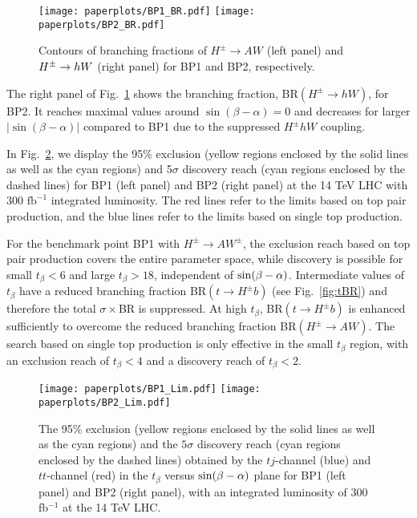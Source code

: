  \begin{figure}[h!]
 \centering
 	\texttt{[image: paperplots/BP1\_BR.pdf]}
	\texttt{[image: paperplots/BP2\_BR.pdf]}
\caption{Contours of branching fractions of $H^{\pm} \rightarrow AW$ (left panel) and $ H^{\pm} \rightarrow h W$ (right panel) for BP1 and BP2, respectively. }
\label{fig:imp_BP_BR}
\end{figure}

The right panel of Fig.~\ref{fig:imp_BP_BR} shows the branching fraction, BR$(H^{\pm} \rightarrow hW)$, for BP2. It reaches maximal values around $\sin(\beta-\alpha)=0$ and decreases for larger $|\sin(\beta-\alpha)|$ compared to BP1 due to the suppressed $H^{\pm} h W$ coupling. 

In Fig.~\ref{fig:imp_BP_Lim}, we display the 95\% exclusion (yellow regions enclosed by the solid lines as well as the cyan regions) and 5$\sigma$ discovery reach (cyan regions enclosed by the dashed lines) for BP1 (left panel) and BP2 (right panel) at the 14 TeV LHC with 300 $\text{fb}^{-1}$ integrated luminosity. The red lines refer to the limits based on top pair production, and the blue lines refer to the limits based on single top production.  

 For the benchmark point BP1 with $H^{\pm} \rightarrow AW^{\pm}$, the exclusion reach based on top pair production covers the entire parameter space, while discovery is possible for small $t_{\beta}<6$ and large $t_{\beta}>18$, independent of $\sin(\beta-\alpha)$. Intermediate values of $t_{\beta}$ have a reduced branching fraction BR$(t \rightarrow H^{\pm} b)$ (see Fig.~\ref{fig:tBR}) and therefore the total $\sigma \times$BR is suppressed. At high $t_{\beta}$, BR$(t \rightarrow H^{\pm} b)$ is enhanced sufficiently to overcome the reduced branching fraction BR$(H^{\pm} \rightarrow AW)$. The search based on single top production is only effective in the small $t_{\beta}$ region, with an exclusion reach of $t_{\beta} <4$ and a discovery reach of $t_{\beta}<2$. 

 \begin{figure}[h!]
 \centering
 	\texttt{[image: paperplots/BP1\_Lim.pdf]}
	\texttt{[image: paperplots/BP2\_Lim.pdf]}
\caption{The 95\% exclusion (yellow regions enclosed by the solid lines as well as the cyan regions) and the $5\sigma$ discovery reach (cyan regions enclosed by the dashed lines) obtained by the $tj$-channel (blue) and $tt$-channel (red) in the $t_{\beta}$ versus $\sin(\beta-\alpha)$ plane for BP1 (left panel) and BP2 (right panel), with an integrated luminosity of 300 fb$^{-1}$ at the 14 TeV LHC. }
\label{fig:imp_BP_Lim}
\end{figure}

